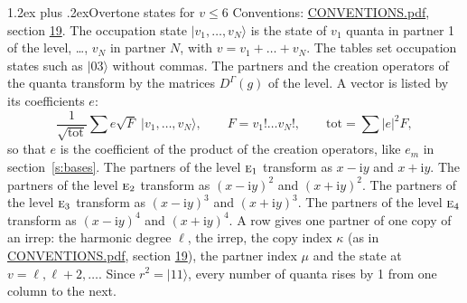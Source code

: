 \documentclass[10pt,a4paper]{article}
\makeatletter
\renewcommand\section{\@startsection{section}{1}{\z@}{-3ex plus -1ex minus -.2ex}%
  {1.2ex plus .2ex}{\normalfont\large\sffamily\bfseries\color{parttitle}}}
\numberwithin{equation}{section}
\newcommand{\irr}[1]{\text{\normalfont\scshape #1}}
\newcommand{\iunit}{\mathrm{i}}
\newcommand{\repD}[1]{D^{#1}}
\newcommand{\mult}{\kappa}
\newcommand{\intx}{\mu}
\newcommand{\occ}[1]{\lvert #1\rangle}
\makeatother
\begin{document}
\section{Overtone states for \texorpdfstring{$v \le 6$}{v \textleq\ 6}}\label{s:overtone_states}
Conventions: \href{../../CONVENTIONS.pdf}{CONVENTIONS.pdf}, section \href{../../CONVENTIONS.pdf\#conv.19}{19}.
\leavevmode\label{n:vector.occupation}\label{n:local.quanta.partner}\label{n:local.weight.occupation}The occupation state $\occ{v_1, \dots, v_N}$ is the state of $v_1$ quanta in partner 1 of the level, \dots, $v_N$ in partner $N$, with $v = v_1 + \dots + v_N$. The tables set occupation states such as $\occ{03}$ without commas. The partners and the creation operators of the quanta transform by the matrices $\repD{\Gamma}(g)$ of the level. A vector is listed by its coefficients $e$:
\begin{equation}\label{e:occupation}\frac{1}{\sqrt{\mathrm{tot}}}\sum e\sqrt{F}\;\occ{v_1, \dots, v_N},\qquad F = v_1!\dots v_N!,\qquad \mathrm{tot} = \sum |e|^2F,\end{equation}
so that $e$ is the coefficient of the product of the creation operators, like $e_m$ in section~\ref{s:bases}. The partners of the level $\irr{e}_{1}$ transform as $x - \iunit y$ and $x + \iunit y$. The partners of the level $\irr{e}_{2}$ transform as $(x - \iunit y)^{2}$ and $(x + \iunit y)^{2}$. The partners of the level $\irr{e}_{3}$ transform as $(x - \iunit y)^{3}$ and $(x + \iunit y)^{3}$. The partners of the level $\irr{e}_{4}$ transform as $(x - \iunit y)^{4}$ and $(x + \iunit y)^{4}$. A row gives one partner of one copy of an irrep: the harmonic degree $\ell$, the irrep, the copy index $\mult$ (as in \href{../../CONVENTIONS.pdf}{CONVENTIONS.pdf}, section \href{../../CONVENTIONS.pdf\#conv.19}{19}), the partner index $\intx$ and the state at $v = \ell, \ell + 2, \dots$. Since $r^2 = \occ{11}$, every number of quanta rises by 1 from one column to the next.
\end{document}
